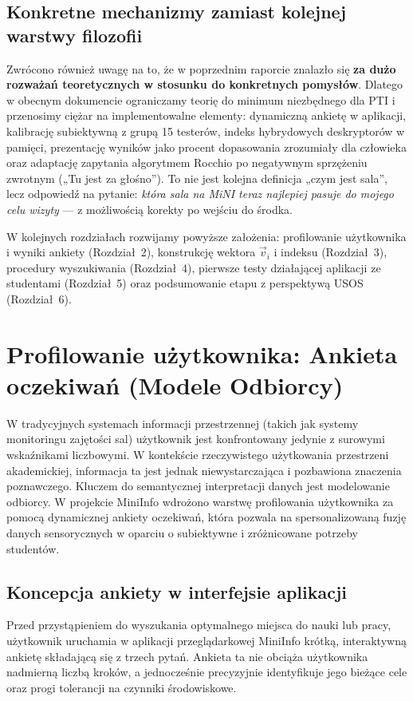 \documentclass[14pt,a4paper]{extarticle}
\begin{document}
\subsection{Konkretne mechanizmy zamiast kolejnej warstwy filozofii}
Zwrócono również uwagę na to, że w poprzednim raporcie znalazło się \textbf{za dużo rozważań teoretycznych w stosunku do konkretnych pomysłów}. Dlatego w obecnym dokumencie ograniczamy teorię do minimum niezbędnego dla PTI i przenosimy ciężar na implementowalne elementy: dynamiczną ankietę w aplikacji, kalibrację subiektywną z grupą 15 testerów, indeks hybrydowych deskryptorów w pamięci, prezentację wyników jako procent dopasowania zrozumiały dla człowieka oraz adaptację zapytania algorytmem Rocchio po negatywnym sprzężeniu zwrotnym („Tu jest za głośno”). To nie jest kolejna definicja „czym jest sala”, lecz odpowiedź na pytanie: \emph{która sala na MiNI teraz najlepiej pasuje do mojego celu wizyty} --- z możliwością korekty po wejściu do środka.

W kolejnych rozdziałach rozwijamy powyższe założenia: profilowanie użytkownika i wyniki ankiety (Rozdział~2), konstrukcję wektora $\vec{v}_i$ i indeksu (Rozdział~3), procedury wyszukiwania (Rozdział~4), pierwsze testy działającej aplikacji ze studentami (Rozdział~5) oraz podsumowanie etapu z perspektywą USOS (Rozdział~6).

\section{Profilowanie użytkownika: Ankieta oczekiwań (Modele Odbiorcy)}

W tradycyjnych systemach informacji przestrzennej (takich jak systemy monitoringu zajętości sal) użytkownik jest konfrontowany jedynie z surowymi wskaźnikami liczbowymi. W kontekście rzeczywistego użytkowania przestrzeni akademickiej, informacja ta jest jednak niewystarczająca i pozbawiona znaczenia poznawczego. Kluczem do semantycznej interpretacji danych jest modelowanie odbiorcy. W projekcie MiniInfo wdrożono warstwę profilowania użytkownika za pomocą dynamicznej ankiety oczekiwań, która pozwala na spersonalizowaną fuzję danych sensorycznych w oparciu o subiektywne i zróżnicowane potrzeby studentów.

\subsection{Koncepcja ankiety w interfejsie aplikacji}
Przed przystąpieniem do wyszukania optymalnego miejsca do nauki lub pracy, użytkownik uruchamia w aplikacji przeglądarkowej MiniInfo krótką, interaktywną ankietę składającą się z trzech pytań. Ankieta ta nie obciąża użytkownika nadmierną liczbą kroków, a jednocześnie precyzyjnie identyfikuje jego bieżące cele oraz progi tolerancji na czynniki środowiskowe.
\end{document}
